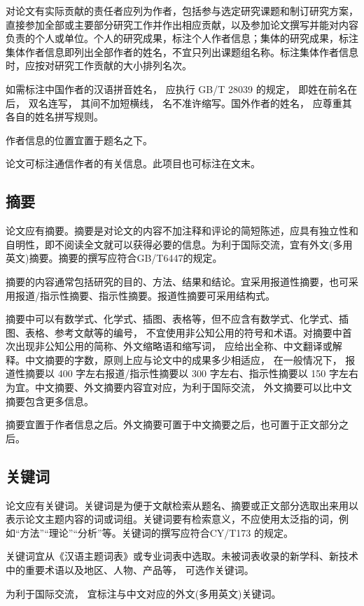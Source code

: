 对论文有实际贡献的责任者应列为作者，包括参与选定研究课题和制订研究方案，直接参加全部或主要部分研究工作并作出相应贡献，以及参加论文撰写并能对内容负责的个人或单位。个人的研究成果，标注个人作者信息；集体的研究成果，标注集体作者信息即列出全部作者的姓名，不宜只列出课题组名称。标注集体作者信息时，应按对研究工作贡献的大小排列名次。

如需标注中国作者的汉语拼音姓名， 应执行 GB/T 28039 的规定， 即姓在前名在后， 双名连写， 其间不加短横线， 名不准许缩写。国外作者的姓名， 应尊重其各自的姓名拼写规则。

作者信息的位置宜置于题名之下。

论文可标注通信作者的有关信息。此项目也可标注在文末。

\subsection{摘要}
论文应有摘要。摘要是对论文的内容不加注释和评论的简短陈述，应具有独立性和自明性，即不阅读全文就可以获得必要的信息。为利于国际交流，宜有外文(多用英文)摘要。摘要的撰写应符合GB/T6447的规定。

摘要的内容通常包括研究的目的、方法、结果和结论。宜采用报道性摘要，也可采用报道/指示性摘要、指示性摘要。报道性摘要可采用结构式。

摘要中可以有数学式、化学式、插图、表格等，但不应含有数学式、化学式、插图、表格、参考文献等的编号， 不宜使用非公知公用的符号和术语。对摘要中首次出现非公知公用的简称、外文缩略语和缩写词， 应给出全称、中文翻译或解释。中文摘要的字数，原则上应与论文中的成果多少相适应， 在一般情况下， 报道性摘要以 400 字左右报道/指示性摘要以 300 字左右、指示性摘要以 150 字左右为宜。中文摘要、外文摘要内容宜对应，为利于国际交流， 外文摘要可以比中文摘要包含更多信息。

摘要宜置于作者信息之后。外文摘要可置于中文摘要之后，也可置于正文部分之后。

\subsection{关键词}
论文应有关键词。关键词是为便于文献检索从题名、摘要或正文部分选取出来用以表示论文主题内容的词或词组。关键词要有检索意义，不应使用太泛指的词，例如“方法”“理论”“分析”等。关键词的撰写应符合CY/T173 的规定。

关键词宜从《汉语主题词表》或专业词表中选取。未被词表收录的新学科、新技术中的重要术语以及地区、人物、产品等， 可选作关键词。

为利于国际交流， 宜标注与中文对应的外文(多用英文)关键词。


